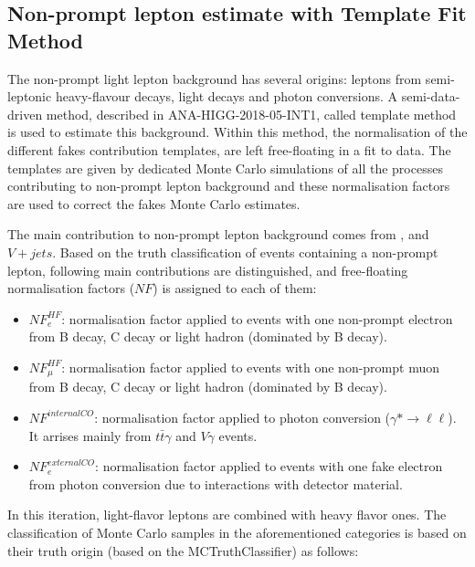 \clearpage
\subsection{Non-prompt lepton estimate with Template Fit Method}

The non-prompt light lepton background has several origins:
leptons from semi-leptonic heavy-flavour decays, light decays and photon
conversions. A semi-data-driven method, described in ANA-HIGG-2018-05-INT1,
called template method is used to estimate this background.
Within this method, the normalisation of the different fakes contribution
templates, are left free-floating in a fit to data.
The templates are given by dedicated Monte Carlo simulations of all the
processes contributing to 
non-prompt  lepton background and these
normalisation factors are used to correct the fakes Monte Carlo
estimates. 

The main contribution to non-prompt lepton background comes from \ttbar,
and $V+jets$. Based on the truth classification of events containing a non-prompt lepton, following
main contributions are distinguished, and free-floating normalisation factors
($NF$) is assigned to each of them: 

\begin{itemize}
\item $NF^{HF}_{e}$: normalisation factor applied to events with one
  non-prompt electron from B decay, C decay or light hadron  (dominated by B
  decay).  
\item $NF^{HF}_{\mu}$: normalisation factor applied to events with one
 non-prompt muon from B decay, C decay or light hadron  (dominated by B
  decay).
\item $NF^{internal CO}$: normalisation factor applied to photon conversion
  ($\gamma * \rightarrow \ell \ell$). It arrises mainly from $t\bar{t}\gamma$
  and $V\gamma$ events.
\item $NF^{external CO}_{e}$: normalisation factor applied to events with one
  fake electron from photon conversion due to interactions with detector material.
\end{itemize}

In this iteration, light-flavor leptons are combined with heavy flavor ones.
The classification of Monte Carlo samples in the aforementioned categories is
based on their truth origin (based on the MCTruthClassifier) as follows: 

